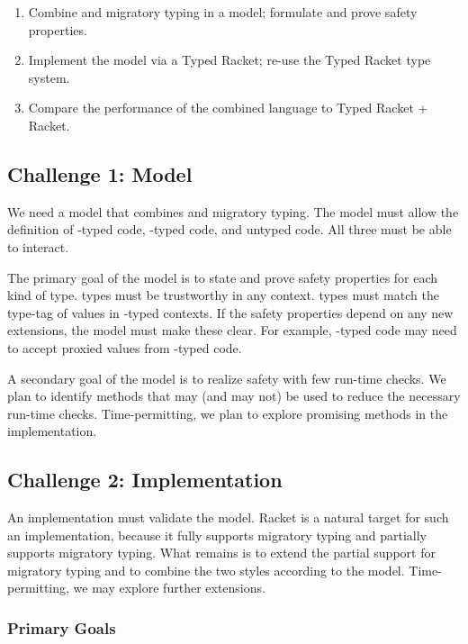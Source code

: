 \begin{enumerate}
\item Combine \tdeep{} and \tshallow{} migratory typing in a model; formulate and prove safety properties.
\item Implement the model via a \tShallow{} Typed Racket; re-use the Typed Racket type system.
\item Compare the performance of the combined language to Typed Racket + Racket.
\end{enumerate}

\subsection{Challenge 1: Model}

We need a model that combines \tdeep{} and \tshallow{} migratory typing.
The model must allow the definition of \tdeep{}-typed code, \tshallow{}-typed code, and untyped code.
All three must be able to interact.

The primary goal of the model is to state and prove safety properties for each kind of type.
\tDeep{} types must be trustworthy in any context.
\tShallow{} types must match the type-tag of values in \tshallow{}-typed contexts.
If the safety properties depend on any new extensions, the model must make these clear.
For example, \tshallow{}-typed code may need to accept proxied values from \tdeep{}-typed code.


A secondary goal of the model is to realize safety with few run-time checks.
We plan to identify methods that may (and may not) be used to reduce the necessary run-time checks.
Time-permitting, we plan to explore promising methods in the implementation.


\subsection{Challenge 2: Implementation}

An implementation must validate the model.
Racket is a natural target for such an implementation, because it fully supports \tdeep{} migratory typing and partially supports \tshallow{} migratory typing.
What remains is to extend the partial support for \tshallow{} migratory typing and to combine the two styles according to the model.
Time-permitting, we may explore further extensions.


\subsubsection{Primary Goals}


